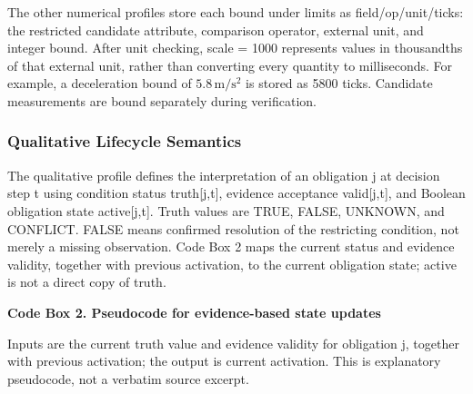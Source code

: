 \documentclass[nolineno]{ieeeaccess}
\begin{document}
The other numerical profiles store each bound under {\ttfamily{}\selectfont\footnotesize limits} as {\ttfamily{}\selectfont\footnotesize field/\allowbreak op/\allowbreak unit/\allowbreak ticks}: the restricted candidate attribute, comparison operator, external unit, and integer bound. After unit checking, {\ttfamily{}\selectfont\footnotesize scale = 1000} represents values in thousandths of that external unit, rather than converting every quantity to milliseconds. For example, a deceleration bound of $5.8\,\mathrm{m/s^{2}}$ is stored as 5800 ticks. Candidate measurements are bound separately during verification.\par

\subsubsection{Qualitative Lifecycle Semantics}

The qualitative profile defines the interpretation of an obligation j at decision step t using condition status {\ttfamily{}\selectfont\footnotesize truth[j,t]}, evidence acceptance {\ttfamily{}\selectfont\footnotesize valid[j,t]}, and Boolean obligation state {\ttfamily{}\selectfont\footnotesize active[j,t]}. Truth values are TRUE, FALSE, UNKNOWN, and CONFLICT. FALSE means confirmed resolution of the restricting condition, not merely a missing observation. Code Box 2 maps the current status and evidence validity, together with previous activation, to the current obligation state; {\ttfamily{}\selectfont\footnotesize active} is not a direct copy of {\ttfamily{}\selectfont\footnotesize truth}.\par

\textbf{Code Box 2. Pseudocode for evidence-based state updates}\par

Inputs are the current truth value and evidence validity for obligation j, together with previous activation; the output is current activation. This is explanatory pseudocode, not a verbatim source excerpt.\par
\end{document}
